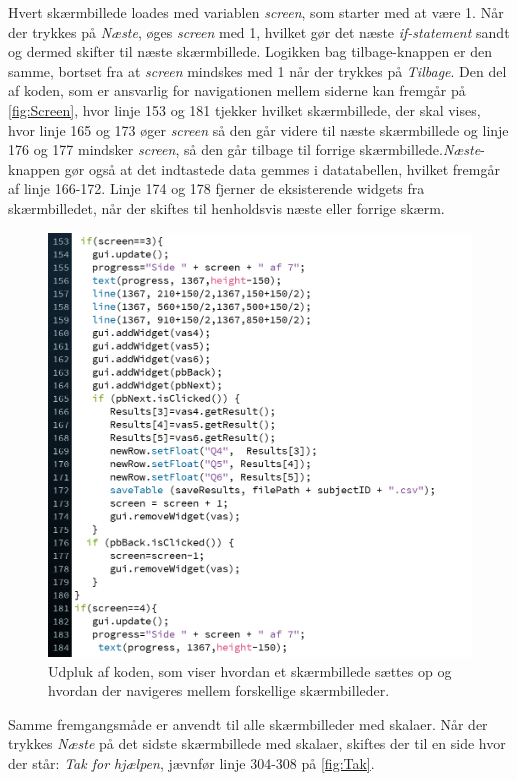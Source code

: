 Hvert skærmbillede loades med variablen \textit{screen}, som starter med at være 1. Når der trykkes på \textit{Næste}, øges \textit{screen} med 1, hvilket gør det næste \textit{if-statement} sandt og dermed skifter til næste skærmbillede. Logikken bag tilbage-knappen er den samme, bortset fra at \textit{screen} mindskes med 1 når der trykkes på \textit{Tilbage}. Den del af koden, som er ansvarlig for navigationen mellem siderne kan fremgår på \autoref{fig:Screen}, hvor linje 153 og 181 tjekker hvilket skærmbillede, der skal vises, hvor linje 165 og 173 øger \textit{screen} så den går videre til næste skærmbillede og linje 176 og 177 mindsker \textit{screen}, så den går tilbage til forrige skærmbillede.\textit{Næste}-knappen gør også at det indtastede data gemmes i datatabellen, hvilket fremgår af linje 166-172. Linje 174 og 178 fjerner de eksisterende widgets fra skærmbilledet, når der skiftes til henholdsvis næste eller forrige skærm.
\newpage
%
\begin{figure}[H]
\centering
\includegraphics[width =\textwidth]{Figure/VASProgram/Screen} 
\caption{Udpluk af koden, som viser hvordan et skærmbillede sættes op og hvordan der navigeres mellem forskellige skærmbilleder.}
\label{fig:Screen}
\end{figure}
\noindent
%
Samme fremgangsmåde er anvendt til alle skærmbilleder med skalaer. Når der trykkes \textit{Næste} på det sidste skærmbillede med skalaer, skiftes der til en side hvor der står: \textit{Tak for hjælpen}, jævnfør linje 304-308 på \autoref{fig:Tak}.
